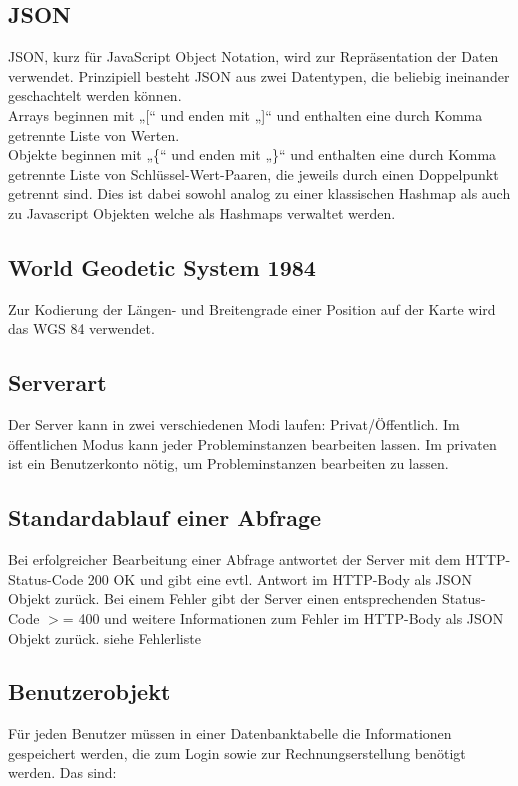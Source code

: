 \documentclass[ngerman,titlepage,parskip=true]{scrartcl}
\begin{document}
	\subsection{JSON}
	 
	JSON, kurz für JavaScript Object Notation, wird zur Repräsentation der Daten verwendet.
	Prinzipiell besteht JSON aus zwei Datentypen, die beliebig ineinander geschachtelt werden können. \\
	Arrays beginnen mit „[“ und enden mit „]“ und enthalten eine durch Komma getrennte Liste von Werten. \\
	Objekte beginnen mit „\{“ und enden mit „\}“ und enthalten eine durch Komma getrennte Liste von Schlüssel-Wert-Paaren, die jeweils durch einen Doppelpunkt getrennt sind.
	Dies ist dabei sowohl analog zu einer klassischen Hashmap als auch zu Javascript Objekten welche als Hashmaps verwaltet werden.
	
	\subsection{World Geodetic System 1984}
	
	Zur Kodierung der Längen- und Breitengrade einer Position auf der Karte wird das WGS 84 verwendet.
	
	\subsection*{Serverart}
	Der Server kann in zwei verschiedenen Modi laufen: Privat/Öffentlich. Im öffentlichen Modus kann jeder Probleminstanzen bearbeiten lassen. Im privaten ist ein Benutzerkonto nötig, um Probleminstanzen bearbeiten zu lassen.
	
	\subsection{Standardablauf einer Abfrage}
	Bei erfolgreicher Bearbeitung einer Abfrage antwortet der Server mit dem HTTP-Status-Code 200 OK und gibt eine evtl. Antwort im HTTP-Body als JSON Objekt zurück. Bei einem Fehler gibt der Server einen entsprechenden Status-Code $>$= 400 und weitere Informationen zum Fehler im HTTP-Body als JSON Objekt zurück. siehe Fehlerliste %


	\subsection{Benutzerobjekt}
	\label{benutzerobjekt}
	Für jeden Benutzer müssen in einer Datenbanktabelle die Informationen gespeichert werden, die zum Login sowie zur Rechnungserstellung benötigt werden. 
	Das sind:
	
\end{document}
